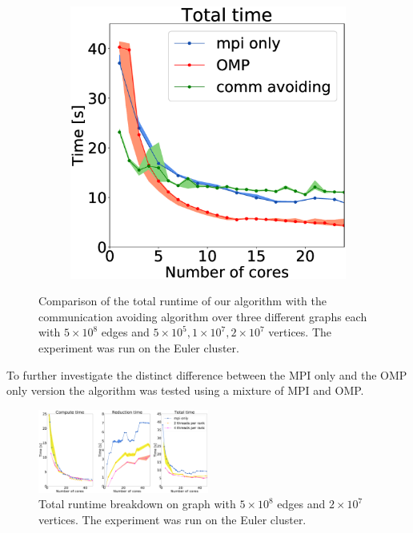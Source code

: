 \begin{figure}
\begin{subfigure}[c]{\fsize}
    \label{fig:mpi_omp_commavoiding_euler_2}
\end{subfigure}
    \begin{subfigure}[c]{\fsize}
        \includegraphics[width=\textwidth]{plots/20000our_impl}
\label{fig:mpi_omp_commavoiding_euler_3}
    \end{subfigure}
    
    \caption{Comparison of the total runtime of our algorithm with the communication avoiding
    algorithm \cite{comm_avoiding} over three different graphs each with $5\times10^{8}$ edges
    and $5\times10^5, 1\times10^7, 2\times10^7$ vertices. The experiment was run on the Euler
cluster.}
    \label{fig:mpi_omp_commavoiding_euler}
\end{figure}

To further investigate the distinct difference between the MPI only and the OMP only version the
algorithm was tested using a mixture of MPI and OMP.

\begin{figure}
\includegraphics[width=0.5\textwidth]{plots/20000mpi_mixtures_with_everything}
\caption{Total runtime breakdown on graph with $5\times10^{8}$ edges and $2\times10^{7}$ vertices.
The experiment was run on the Euler cluster.}
\label{fig:mixed_euler}
\end{figure}

